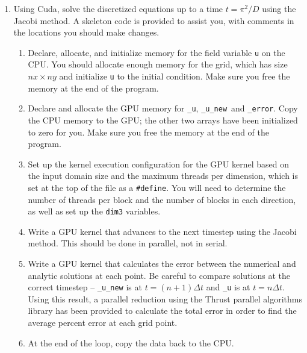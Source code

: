 \documentclass[11pt]{article}
\begin{document}
    \begin{enumerate}
      \item Using Cuda, solve the discretized equations up to a time \(t = \pi^2/D\) using the Jacobi method.
        A skeleton code is provided to assist you, with comments in the locations you should make changes.
        \begin{enumerate}[Step I --]
          \item Declare, allocate, and initialize memory for the field variable \texttt{u} on the CPU.
            You should allocate enough memory for the grid, which has size \(nx \times ny\) and initialize \texttt{u} to the initial condition.
            Make sure you free the memory at the end of the program.
          \item Declare and allocate the GPU memory for \texttt{\_u}, \texttt{\_u\_new}\, and \texttt{\_error}.
            Copy the CPU memory to the GPU; the other two arrays have been initialized to zero for you.
            Make sure you free the memory at the end of the program.
          \item Set up the kernel execution configuration for the GPU kernel based on the input domain size and the maximum threads per dimension,
            which is set at the top of the file as a \texttt{\#define}.
            You will need to determine the number of threads per block and the number of blocks in each direction, as well as set up the \texttt{dim3} variables.
          \item Write a GPU kernel that advances to the next timestep using the Jacobi method.
            This should be done in parallel, not in serial.
          \item Write a GPU kernel that calculates the error between the numerical and analytic solutions at each point.
            Be careful to compare solutions at the correct timestep -- \texttt{\_u\_new} is at \(t = (n+1) \Delta t\) and \texttt{\_u} is at \(t = n \Delta t\).
            Using this result, a parallel reduction using the Thrust parallel algorithms library has been provided to calculate the total error in order to find the average percent error at each grid point.
          \item At the end of the loop, copy the data back to the CPU.
        \end{enumerate}
    \end{enumerate}
    
\end{document}
